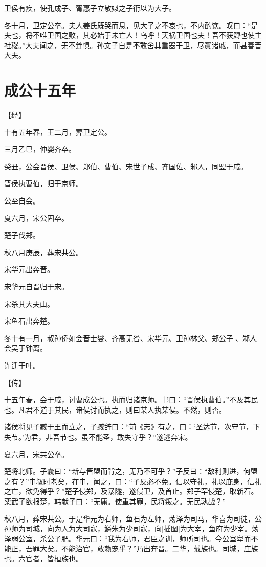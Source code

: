 \documentclass[a4paper,12pt,UTF8,twoside]{ctexbook}
\begin{document}
卫侯有疾，使孔成子、甯惠子立敬姒之子衎以为大子。

冬十月，卫定公卒。夫人姜氏既哭而息，见大子之不哀也，不内酌饮。叹曰：“是夫也，将不唯卫国之败，其必始于未亡人！乌呼！天祸卫国也夫！吾不获鱄也使主社稷。”大夫闻之，无不耸惧。孙文子自是不敢舍其重器于卫，尽寘诸戚，而甚善晋大夫。

\section{成公十五年}


【经】

十有五年春，王二月，葬卫定公。

三月乙巳，仲婴齐卒。

癸丑，公会晋侯、卫侯、郑伯、曹伯、宋世子成、齐国佐、邾人，同盟于戚。



晋侯执曹伯，归于京师。

公至自会。

夏六月，宋公固卒。

楚子伐郑。

秋八月庚辰，葬宋共公。

宋华元出奔晋。

宋华元自晋归于宋。

宋杀其大夫山。

宋鱼石出奔楚。

冬十有一月，叔孙侨如会晋士燮、齐高无咎、宋华元、卫孙林父、郑公子、邾人会吴于钟离。

许迁于叶。

【传】

十五年春，会于戚，讨曹成公也。执而归诸京师。书曰：“晋侯执曹伯。”不及其民也。凡君不道于其民，诸侯讨而执之，则曰某人执某侯。不然，则否。

诸侯将见子臧于王而立之，子臧辞曰：“前《志》有之，曰：‘圣达节，次守节，下失节。’为君，非吾节也。虽不能圣，敢失守乎？”遂逃奔宋。

夏六月，宋共公卒。

楚将北师。子囊曰：“新与晋盟而背之，无乃不可乎？”子反曰：“敌利则进，何盟之有？”申叔时老矣，在申，闻之，曰：“子反必不免。信以守礼，礼以庇身，信礼之亡，欲免得乎？”楚子侵郑，及暴隧，遂侵卫，及首止。郑子罕侵楚，取新石。栾武子欲报楚，韩献子曰：“无庸。使重其罪，民将叛之。无民孰战？”

秋八月，葬宋共公。于是华元为右师，鱼石为左师，荡泽为司马，华喜为司徒，公孙师为司城，向为人为大司寇，鳞朱为少司寇，向[插图]为大宰，鱼府为少宰。荡泽弱公室，杀公子肥。华元曰：“我为右师，君臣之训，师所司也。今公室卑而不能正，吾罪大矣。不能治官，敢赖宠乎？”乃出奔晋。二华，戴族也。司城，庄族也。六官者，皆桓族也。
\end{document}
